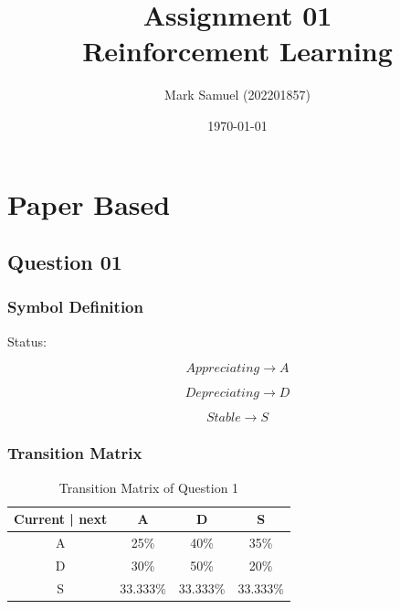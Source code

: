 \documentclass{article}
\begin{document}
\date{\today}
\author{Mark Samuel (202201857)}
\title{Assignment 01 \\ 
        \large Reinforcement Learning }
\maketitle

\section{Paper Based}

\subsection{Question 01}
\subsubsection{Symbol Definition}
\large Status:

\begin{equation}
    Appreciating \rightarrow A
\end{equation}

\begin{equation}
    Depreciating \rightarrow D
\end{equation}

\begin{equation}
    Stable \rightarrow S
\end{equation}

\subsubsection{Transition Matrix}
\begin{table}[h!]
    \centering
    \begin{tabular}{|c | c | c | c|}
        \hline
        Current | next & A & D & S\\ 
        \hline
        A & 25\% & 40\% & 35\% \\
        D & 30\% & 50\% & 20\% \\
        S & 33.333\% & 33.333\% & 33.333\% \\
        \hline
    \end{tabular}
    \caption{Transition Matrix of Question 1}
    \label{q1_Transition_matrix}
\end{table}
\end{document}
